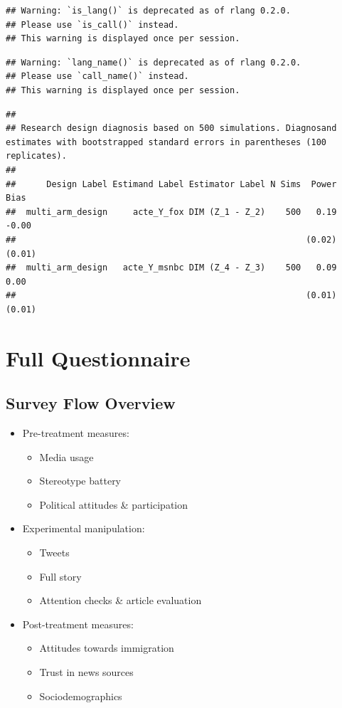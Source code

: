 \documentclass[]{article}
\providecommand{\tightlist}{%
  \setlength{\itemsep}{0pt}\setlength{\parskip}{0pt}}
\begin{document}
\begin{verbatim}
## Warning: `is_lang()` is deprecated as of rlang 0.2.0.
## Please use `is_call()` instead.
## This warning is displayed once per session.
\end{verbatim}

\begin{verbatim}
## Warning: `lang_name()` is deprecated as of rlang 0.2.0.
## Please use `call_name()` instead.
## This warning is displayed once per session.
\end{verbatim}

\begin{verbatim}
## 
## Research design diagnosis based on 500 simulations. Diagnosand estimates with bootstrapped standard errors in parentheses (100 replicates).
## 
##      Design Label Estimand Label Estimator Label N Sims  Power   Bias
##  multi_arm_design     acte_Y_fox DIM (Z_1 - Z_2)    500   0.19  -0.00
##                                                         (0.02) (0.01)
##  multi_arm_design   acte_Y_msnbc DIM (Z_4 - Z_3)    500   0.09   0.00
##                                                         (0.01) (0.01)
\end{verbatim}

\hypertarget{full-questionnaire}{%
\section{Full Questionnaire}\label{full-questionnaire}}

\hypertarget{survey-flow-overview}{%
\subsection{Survey Flow Overview}\label{survey-flow-overview}}

\begin{itemize}
\tightlist
\item
  Pre-treatment measures:

  \begin{itemize}
  \tightlist
  \item
    Media usage
  \item
    Stereotype battery
  \item
    Political attitudes \& participation
  \end{itemize}
\item
  Experimental manipulation:

  \begin{itemize}
  \tightlist
  \item
    Tweets
  \item
    Full story
  \item
    Attention checks \& article evaluation
  \end{itemize}
\item
  Post-treatment measures:

  \begin{itemize}
  \tightlist
  \item
    Attitudes towards immigration
  \item
    Trust in news sources
  \item
    Sociodemographics
  \end{itemize}
\end{itemize}
\end{document}
